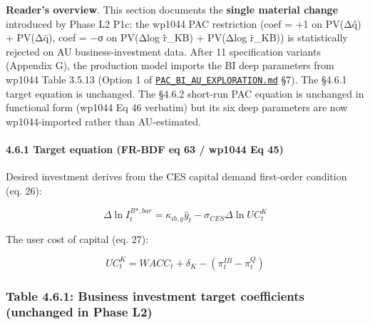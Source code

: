 \documentclass[
]{article}
\begin{document}
\textbf{Reader's overview}. This section documents the \textbf{single
material change} introduced by Phase L2 P1c: the wp1044 PAC restriction
(coef = +1 on PV(Δq̂) + PV(Δq̄), coef = −σ on PV(Δlog r̂\_KB) + PV(Δlog
r̄\_KB)) is statistically rejected on AU business-investment data. After
11 specification variants (Appendix G), the production model imports the
BI deep parameters from wp1044 Table 3.5.13 (Option 1 of
\href{../PAC_BI_AU_EXPLORATION.md}{\texttt{PAC\_BI\_AU\_EXPLORATION.md}}
§7). The §4.6.1 target equation is unchanged. The §4.6.2 short-run PAC
equation is unchanged in functional form (wp1044 Eq 46 verbatim) but its
six deep parameters are now wp1044-imported rather than AU-estimated.

\paragraph{4.6.1 Target equation (FR-BDF eq 63 / wp1044 Eq
45)}\label{target-equation-fr-bdf-eq-63-wp1044-eq-45}

Desired investment derives from the CES capital demand first-order
condition (eq. 26):

\[\Delta \ln I^{B*,bar}_t = \kappa_{ib,y} \hat{y}_t - \sigma_{CES} \Delta \ln UC^K_t\]

The user cost of capital (eq. 27):

\[UC^K_t = WACC_t + \delta_K - (\pi^{IB}_t - \pi^Q_t)\]

\subsubsection{Table 4.6.1: Business investment target coefficients
(unchanged in Phase
L2)}\label{table-4.6.1-business-investment-target-coefficients-unchanged-in-phase-l2}
\end{document}
